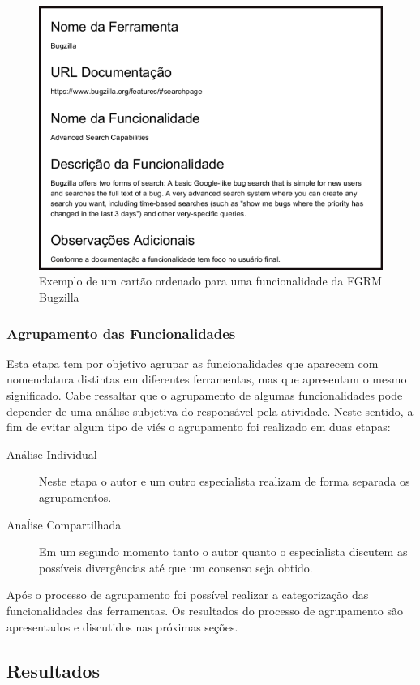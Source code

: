 \begin{figure}[htpb]
	\centering
	\includegraphics[width=0.6\linewidth]{./chapter-estudo-funcionalidades-fgrm/img/exemplo_cartao_ordenado.png}
	\caption{Exemplo de um cartão ordenado para uma funcionalidade da FGRM
		Bugzilla}
\label{fig:exemplo_cartao_ordenado}
\end{figure}
\todoend{}

\subsubsection{Agrupamento das Funcionalidades}
\label{subsec:agrupamento_fucionalidades}

Esta etapa tem por objetivo agrupar as funcionalidades que aparecem com
nomenclatura distintas em diferentes ferramentas, mas que apresentam o mesmo
significado. Cabe ressaltar que o agrupamento de algumas funcionalidades pode
depender de uma análise subjetiva do responsável pela atividade. Neste sentido,
a fim de evitar algum tipo de viés o agrupamento foi realizado em duas etapas:

\begin{description}
	\item[Análise Individual] Neste etapa o autor e um outro especialista
		realizam de forma separada os agrupamentos.
	\item[Anaĺise Compartilhada] Em um segundo momento tanto o autor quanto o
		es\-pe\-ci\-a\-lis\-ta discutem as possíveis divergências até que um
		consenso seja obtido.
\end{description}

Após o processo de agrupamento foi possível realizar a categorização das
funcionalidades das ferramentas. Os resultados do processo de agrupamento são
apresentados e discutidos nas próximas seções.

\subsection{Resultados}
\label{sec:resultados}

